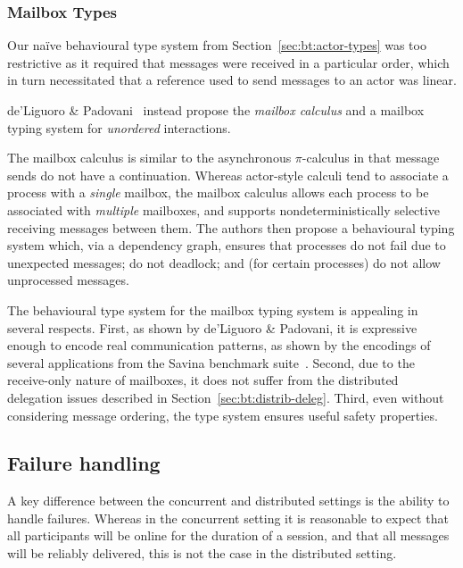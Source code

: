 \documentclass[
graybox,
envcountchap
]{svmult}
\begin{document}
\begin{bibunit}
  \subsubsection{Mailbox Types}
  Our na\"ive behavioural type system from Section~\ref{sec:bt:actor-types} was too
  restrictive as it required that messages were received in a particular order,
  which in turn necessitated that a reference used to send messages to an actor
  was linear.

  de'Liguoro \& Padovani~\cite{deLiguoroP18:mailbox} instead propose the \emph{mailbox calculus}
  and a mailbox typing system for \emph{unordered} interactions.

  The mailbox calculus is similar to the asynchronous $\pi$-calculus in that
  message sends do not have a continuation. Whereas actor-style calculi tend to
  associate a process with a \emph{single} mailbox, the mailbox calculus allows
  each process to be associated with \emph{multiple} mailboxes, and supports
  nondeterministically selective receiving messages between them.
  The authors then propose a behavioural typing system which, via a
  dependency graph, ensures that processes do not fail due to unexpected
  messages; do not deadlock; and (for certain processes) do not allow
  unprocessed messages.

  The behavioural type system for the mailbox typing system is appealing in
  several respects. First, as shown by de'Liguoro \& Padovani, it is expressive
  enough to encode real communication patterns, as shown by the encodings of
  several applications from the Savina benchmark suite~\cite{ImamS14:savina}. Second, due
  to the receive-only nature of mailboxes, it does not suffer from the
  distributed delegation issues described in Section~\ref{sec:bt:distrib-deleg}.
  Third, even without considering message ordering, the type system ensures
  useful
  safety properties.

  \subsection{Failure handling}\label{sec:bt:failure-handling}

  A key difference between the concurrent and distributed settings is the
  ability to handle failures. Whereas in the concurrent setting it is reasonable
  to expect that all participants will be online for the duration of a session,
  and that all messages will be reliably delivered, this is not the case in the
  distributed setting.


\end{bibunit}
\end{document}
